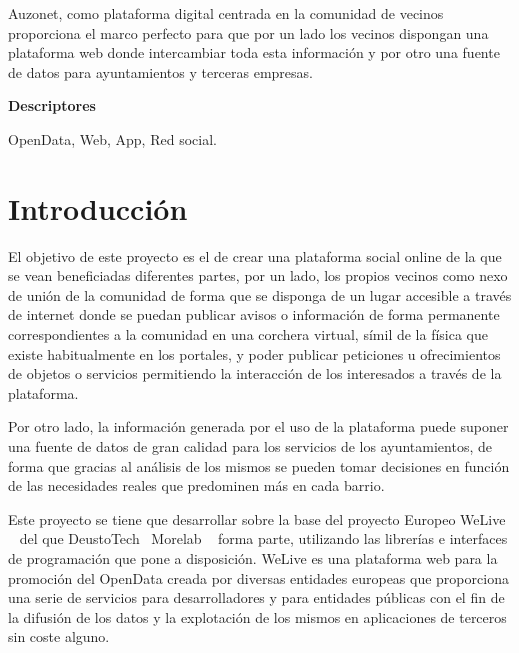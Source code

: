 \documentclass{DeustoFDP}
\begin{document}
Auzonet, como plataforma digital centrada en la comunidad de vecinos proporciona
el marco perfecto para que por un lado los vecinos dispongan una plataforma web
donde intercambiar toda esta información y por otro una fuente de datos para
ayuntamientos y terceras empresas.

\vspace{2em}

{\Large\bfseries\sectionfont Descriptores}
\vspace{3\medskipamount}

OpenData, Web, App, Red social.

\cleardoublepage\tableofcontents
\cleardoublepage\listoffigures
\cleardoublepage\listoftables
\cleardoublepage\listoflistings

\mainmatter
\pagestyle{phdthesis}

\chapter{Introducción}\label{cha:introduccion}
El objetivo de este proyecto es el de crear una plataforma social online de la que se vean beneficiadas diferentes partes, por un lado, los propios vecinos como nexo de unión de la comunidad de forma que se disponga de un lugar accesible a través de internet donde se puedan publicar avisos o información de forma permanente correspondientes a la comunidad en una corchera virtual, símil de la física que existe habitualmente en los portales, y poder publicar peticiones u ofrecimientos de objetos o servicios permitiendo la interacción de los interesados a través de la plataforma.

Por otro lado, la información generada por el uso de la plataforma puede suponer una fuente de datos de gran calidad para los servicios de los ayuntamientos, de forma que gracias al análisis de los mismos se pueden tomar decisiones en función de las necesidades reales que predominen más en cada barrio.

Este proyecto se tiene que desarrollar sobre la base del proyecto Europeo WeLive ~\cite{WeLive} del que DeustoTech~\cite{DeustoTech} Morelab ~\cite{Morelab} forma parte, utilizando las librerías e interfaces de programación que pone a disposición. WeLive es una plataforma web para la promoción del OpenData creada por diversas entidades europeas que proporciona una serie de servicios para desarrolladores y para entidades públicas con el fin de la difusión de los datos y la explotación de los mismos en aplicaciones de terceros sin coste alguno.
\end{document}
